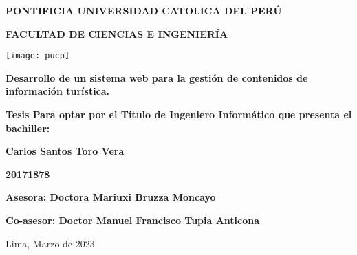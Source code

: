 \begin{titlepage}
    \begin{center}
        \vspace*{1cm}
        \Large
        \textbf{PONTIFICIA UNIVERSIDAD CATOLICA DEL PERÚ}

        \vspace{0.5cm}
        \textbf{FACULTAD DE CIENCIAS E INGENIERÍA}

        \vspace{0.5cm}
        \texttt{[image: pucp]}

        \vspace{1.5cm}
        \textbf{Desarrollo de un sistema web para la gestión de contenidos de información turística.}

        \normalsize
        \vspace{3.5cm}
        \textbf{Tesis Para optar por el Título de Ingeniero Informático que presenta el bachiller:}

        \Large
        \vspace{1.5cm}
        \textbf{Carlos Santos Toro Vera}

        \vspace{0.3cm}
        \textbf{20171878}

        \vspace{3cm}
        \textbf{Asesora: Doctora Mariuxi Bruzza Moncayo}

        \textbf{Co-asesor: Doctor Manuel Francisco Tupia Anticona}

        \normalsize
        \vspace{3cm}
        {Lima, Marzo de 2023}
    \end{center}
\end{titlepage}

